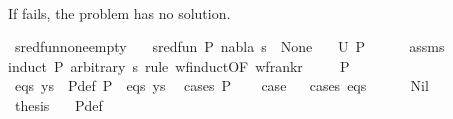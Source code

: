 \begin{isabellebody}
\ \ \ \ \isamarkupfalse%
\isanewline
\ \ \isamarkupfalse%
\isanewline
{}\isamarkupfalse%
%
\endisatagproof
{\isafoldproof}%
%
\isadelimproof
%
\endisadelimproof
%
\begin{isamarkuptext}%
If  fails, the problem has no solution.%
\end{isamarkuptext}\isamarkuptrue%
\isamarkupfalse%
\ sred{\isacharunderscore}{\kern0pt}fun{\isacharunderscore}{\kern0pt}none{\isacharunderscore}{\kern0pt}empty{\isacharcolon}{\kern0pt}\isanewline
\ \ \ {\isachardoublequoteopen}sred{\isacharunderscore}{\kern0pt}fun\ {\isacharparenleft}{\kern0pt}P{\isacharcomma}{\kern0pt}\ nabla{\isacharcomma}{\kern0pt}\ s{\isacharparenright}{\kern0pt}\ {\isacharequal}{\kern0pt}\ None{\isachardoublequoteclose}\isanewline
\ \ \ {\isachardoublequoteopen}U\ P\ {\isacharequal}{\kern0pt}\ {\isacharbraceleft}{\kern0pt}{\isacharbraceright}{\kern0pt}{\isachardoublequoteclose}\isanewline
%
\isadelimproof
\ \ %
\endisadelimproof
%
\isatagproof
{}\isamarkupfalse%
\ assms\isanewline
{}\isamarkupfalse%
{\isacharparenleft}{\kern0pt}induct\ P\ arbitrary{\isacharcolon}{\kern0pt}\ s\ rule{\isacharcolon}{\kern0pt}\ wf{\isacharunderscore}{\kern0pt}induct{\isacharbrackleft}{\kern0pt}OF\ wf{\isacharunderscore}{\kern0pt}rank{\isacharunderscore}{\kern0pt}r{\isacharbrackright}{\kern0pt}{\isacharparenright}{\kern0pt}\isanewline
\ \ \isamarkupfalse%
\ {\isacharparenleft}{\kern0pt}{}\ P{\isacharparenright}{\kern0pt}\isanewline
\ \ \isamarkupfalse%
\ eqs\ ys\ \ P{\isacharunderscore}{\kern0pt}def{\isacharcolon}{\kern0pt}\ {\isachardoublequoteopen}P\ {\isacharequal}{\kern0pt}\ {\isacharparenleft}{\kern0pt}eqs{\isacharcomma}{\kern0pt}\ ys{\isacharparenright}{\kern0pt}{\isachardoublequoteclose}\ \isamarkupfalse%
\ {\isacharparenleft}{\kern0pt}cases\ P{\isacharparenright}{\kern0pt}\isanewline
\ \ \isamarkupfalse%
\ {\isacharquery}{\kern0pt}case\isanewline
\ \ \isamarkupfalse%
{\isacharparenleft}{\kern0pt}cases\ eqs{\isacharparenright}{\kern0pt}\isanewline
\ \ \ \ \isamarkupfalse%
\ Nil\isanewline
\ \ \ \ \isamarkupfalse%
\ \isamarkupfalse%
\ {\isacharquery}{\kern0pt}thesis\ \isamarkupfalse%
\ {}{\isacharparenleft}{\kern0pt}{}{\isacharparenright}{\kern0pt}\ P{\isacharunderscore}{\kern0pt}def\ \isamarkupfalse%

\end{isabellebody}

